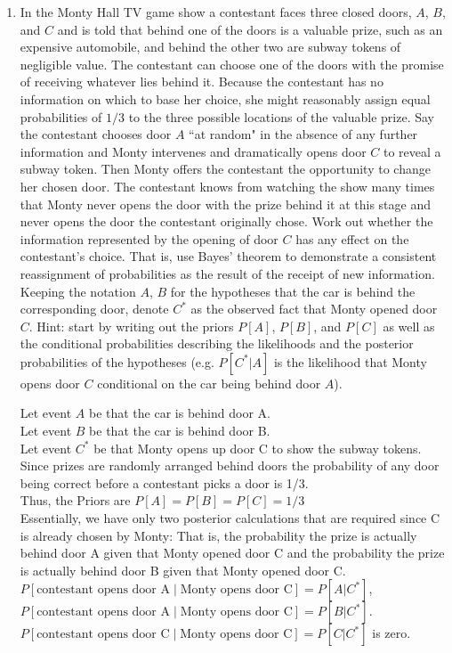 \documentclass[
  12pt,
]{article}
\begin{document}
\begin{enumerate}
\item In the Monty Hall TV game show a contestant faces three closed doors, $A$, $B$, and $C$ and is told that behind one of the doors is a valuable prize, such as an expensive automobile, and behind the other two are subway tokens of negligible value. The contestant can choose one of the doors with the promise of receiving whatever lies behind it. Because the contestant has no information on which to base her choice, she might reasonably assign equal probabilities of $1/3$ to the three possible locations of the valuable prize. Say the contestant chooses door $A$ ``at random" in the absence of any further information and Monty intervenes and dramatically opens door $C$ to reveal a subway token. Then Monty offers the contestant the opportunity to change her chosen door. The contestant knows from watching the show many times that Monty never opens the door with the prize behind it at this stage and never opens the door the contestant originally chose. Work out whether the information represented by the opening of door $C$ has any effect on the contestant’s choice. That is, use Bayes' theorem to demonstrate a consistent reassignment of probabilities as the result of the receipt of new information. Keeping the notation $A$, $B$ for the hypotheses that the car is behind the corresponding door, denote $C^*$ as the observed fact that Monty opened door $C$. Hint: start by writing out the priors $P[A]$, $P[B]$, and $P[C]$ as well as the conditional probabilities describing the likelihoods and the posterior probabilities of the hypotheses (e.g. $P[C^*|A]$ is the likelihood that Monty opens door $C$ conditional on the car being behind door $A$).\\
{
\color{blue}
Let event $A$ be that the car is behind door A.\\
Let event $B$ be that the car is behind door B.\\
Let event $C^*$ be that Monty opens up door C to show the subway tokens.\\

Since prizes are randomly arranged behind doors the probability of any door being correct before a contestant picks a door is 1/3.\\
Thus, the Priors are $P[A]=P[B]=P[C]=1/3$\\

Essentially, we have only two posterior calculations that are required since C is already chosen by Monty:
That is, the probability the prize is actually behind door A given that Monty opened door C and 
the probability the prize is actually behind door B given that Monty opened door C.\\
$ P[\text{contestant opens door A} \mid \text{Monty opens door C}]=P[A|C^*]$,\\
$P[\text{contestant opens door A} \mid \text{Monty opens door C}]=P[B|C^*]$.\\
{
\color{red}
$P[\text{contestant opens door C} \mid \text{Monty opens door C}]=P[C|C^*]$ is zero.\\
}


}
\end{enumerate}
\end{document}
